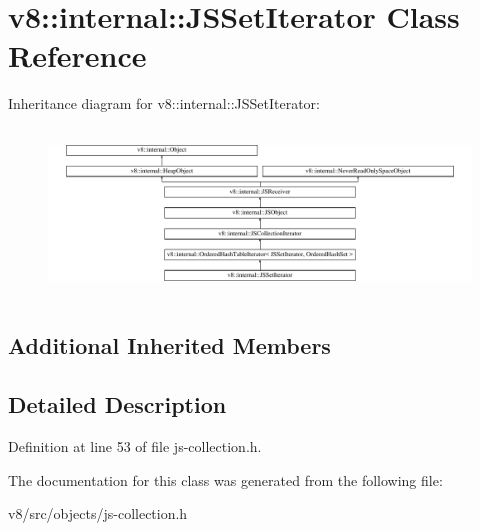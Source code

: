 \hypertarget{classv8_1_1internal_1_1JSSetIterator}{}\section{v8\+:\+:internal\+:\+:J\+S\+Set\+Iterator Class Reference}
\label{classv8_1_1internal_1_1JSSetIterator}
Inheritance diagram for v8\+:\+:internal\+:\+:J\+S\+Set\+Iterator\+:\begin{figure}[H]
\begin{center}
\leavevmode
\includegraphics[height=4.485126cm]{classv8_1_1internal_1_1JSSetIterator}
\end{center}
\end{figure}
\subsection*{Additional Inherited Members}


\subsection{Detailed Description}


Definition at line 53 of file js-\/collection.\+h.



The documentation for this class was generated from the following file\+:\begin{DoxyCompactItemize}
\item 
v8/src/objects/js-\/collection.\+h\end{DoxyCompactItemize}

